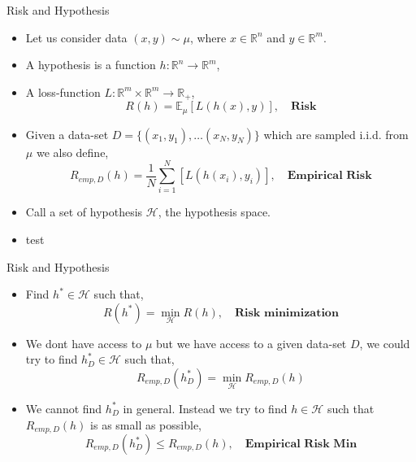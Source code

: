 \documentclass[10pt,handout]{beamer}
\begin{document}
\begin{frame}{Risk and Hypothesis}
	\begin{itemize}
		\item Let us consider data $(x,y) \sim \mu$, where $x \in \mathbb{R}^n$ and $y \in \mathbb{R}^m$.
		\item A hypothesis is a function $h: \mathbb{R}^n \to \mathbb{R}^m$,
		\item A loss-function $L:\mathbb{R}^m \times \mathbb{R}^m \to \mathbb{R}_+$,
		$$R(h) = \mathbb{E}_{\mu}\left[L(h(x),y)\right], \quad \textbf{Risk}$$
		\item Given a data-set $D = \{(x_1,y_1), \ldots (x_N,y_N)\}$ which are sampled i.i.d. from $\mu$ we also define,
 	    $$R_{emp,D} (h) = \frac{1}{N}\sum_{i=1}^N \left[L(h(x_i),y_i)\right], \quad \textbf{Empirical Risk}$$
		\item Call a set of hypothesis $\mathcal{H}$, the hypothesis space.
		\item test
	\end{itemize}
\end{frame}

\begin{frame}{Risk and Hypothesis}
	\begin{itemize}
		\item Find $h^\ast \in \mathcal{H}$ such that,
		$$R(h^\ast) = \min_{\mathcal{H}} R(h), \quad \textbf{Risk minimization}$$

		\item We dont have access to $\mu$ but we have access to a given data-set $D$, we could try to find $h_D^\ast \in \mathcal{H}$ such that,
		$$R_{emp,D}(h_D^\ast) = \min_{\mathcal{H}} R_{emp,D}(h)$$

		\item We cannot find $h_D^\ast$ in general. Instead we try to find $h \in \mathcal{H}$ such that $R_{emp,D}(h)$ is as small as possible,
		$$R_{emp,D}(h_D^\ast) \leq R_{emp,D}(h), \quad \textbf{Empirical Risk Min}$$
	\end{itemize}
\end{frame}
\end{document}
